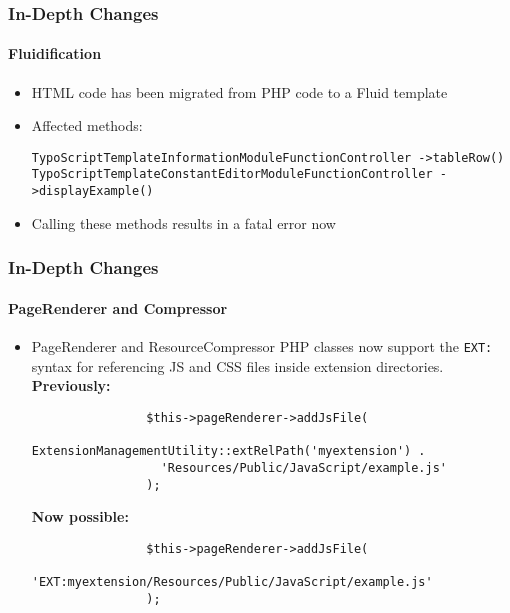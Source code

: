\begin{frame}[fragile]
	\frametitle{In-Depth Changes}
	\framesubtitle{Fluidification}

	\begin{itemize}
		\item HTML code has been migrated from PHP code to a Fluid template
		\item Affected methods:\newline

			\smaller\texttt{TypoScriptTemplateInformationModuleFunctionController\newline
				->tableRow()}\normalsize\newline
			\smaller\texttt{TypoScriptTemplateConstantEditorModuleFunctionController\newline
				->displayExample()}\normalsize

		\item Calling these methods results in a fatal error now

	\end{itemize}

\end{frame}


\begin{frame}[fragile]
	\frametitle{In-Depth Changes}
	\framesubtitle{PageRenderer and Compressor}

	\lstset{basicstyle=\smaller\ttfamily}

	\begin{itemize}

		\item PageRenderer and ResourceCompressor PHP classes now support the
			\texttt{EXT:} syntax for referencing JS and CSS files inside extension
			directories.\newline
			\textbf{Previously:}

			\begin{lstlisting}
				$this->pageRenderer->addJsFile(
				  ExtensionManagementUtility::extRelPath('myextension') .
				  'Resources/Public/JavaScript/example.js'
				);
			\end{lstlisting}

			\textbf{Now possible:}

			\begin{lstlisting}
				$this->pageRenderer->addJsFile(
				  'EXT:myextension/Resources/Public/JavaScript/example.js'
				);
			\end{lstlisting}

	\end{itemize}

\end{frame}

